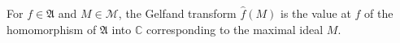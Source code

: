 
For $f \in \mathfrak{A}$ and $M \in \mathcal{M}$, the Gelfand transform $\hat{f}(M)$ is the value at $f$ of the homomorphism of $\mathfrak{A}$ into $\mathbb{C}$ corresponding to the maximal ideal $M$.
